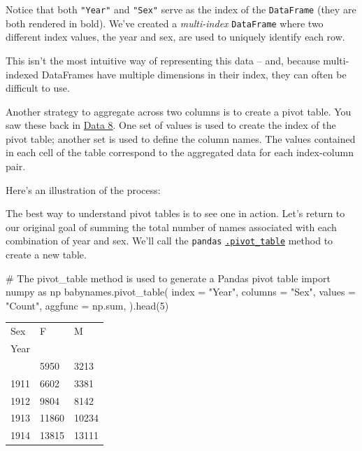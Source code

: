 \documentclass[
  letterpaper,
  DIV=11,
  numbers=noendperiod]{scrreprt}
\newenvironment{Shaded}{\begin{snugshade}}{\end{snugshade}}
\newcommand{\BuiltInTok}[1]{\textcolor[rgb]{0.00,0.23,0.31}{#1}}
\newcommand{\CommentTok}[1]{\textcolor[rgb]{0.37,0.37,0.37}{#1}}
\newcommand{\DecValTok}[1]{\textcolor[rgb]{0.68,0.00,0.00}{#1}}
\newcommand{\ImportTok}[1]{\textcolor[rgb]{0.00,0.46,0.62}{#1}}
\newcommand{\NormalTok}[1]{\textcolor[rgb]{0.00,0.23,0.31}{#1}}
\newcommand{\OperatorTok}[1]{\textcolor[rgb]{0.37,0.37,0.37}{#1}}
\newcommand{\StringTok}[1]{\textcolor[rgb]{0.13,0.47,0.30}{#1}}
\begin{document}
Notice that both \texttt{"Year"} and \texttt{"Sex"} serve as the index
of the \texttt{DataFrame} (they are both rendered in bold). We've
created a \emph{multi-index} \texttt{DataFrame} where two different
index values, the year and sex, are used to uniquely identify each row.

This isn't the most intuitive way of representing this data -- and,
because multi-indexed DataFrames have multiple dimensions in their
index, they can often be difficult to use.

Another strategy to aggregate across two columns is to create a pivot
table. You saw these back in
\href{https://inferentialthinking.com/chapters/08/3/Cross-Classifying_by_More_than_One_Variable.html\#pivot-tables-rearranging-the-output-of-group}{Data
8}. One set of values is used to create the index of the pivot table;
another set is used to define the column names. The values contained in
each cell of the table correspond to the aggregated data for each
index-column pair.

Here's an illustration of the process:

The best way to understand pivot tables is to see one in action. Let's
return to our original goal of summing the total number of names
associated with each combination of year and sex. We'll call the
\texttt{pandas}
\href{https://pandas.pydata.org/pandas-docs/stable/reference/api/pandas.pivot_table.html}{\texttt{.pivot\_table}}
method to create a new table.

\begin{Shaded}
\begin{Highlighting}[]
\CommentTok{\# The \textasciigrave{}pivot\_table\textasciigrave{} method is used to generate a Pandas pivot table}
\ImportTok{import}\NormalTok{ numpy }\ImportTok{as}\NormalTok{ np}
\NormalTok{babynames.pivot\_table(}
\NormalTok{    index }\OperatorTok{=} \StringTok{"Year"}\NormalTok{,}
\NormalTok{    columns }\OperatorTok{=} \StringTok{"Sex"}\NormalTok{,    }
\NormalTok{    values }\OperatorTok{=} \StringTok{"Count"}\NormalTok{, }
\NormalTok{    aggfunc }\OperatorTok{=}\NormalTok{ np.}\BuiltInTok{sum}\NormalTok{, }
\NormalTok{).head(}\DecValTok{5}\NormalTok{)}
\end{Highlighting}
\end{Shaded}

\begin{longtable}[]{@{}lll@{}}
\toprule\noalign{}
Sex & F & M \\
Year & & \\
\midrule\noalign{}
\endhead
\bottomrule\noalign{}
\endlastfoot
1910 & 5950 & 3213 \\
1911 & 6602 & 3381 \\
1912 & 9804 & 8142 \\
1913 & 11860 & 10234 \\
1914 & 13815 & 13111 \\
\end{longtable}
\end{document}

